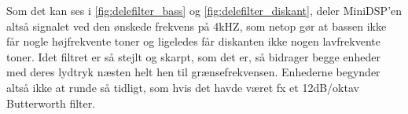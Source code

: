 Som det kan ses i \autoref{fig:delefilter_bass} og  \autoref{fig:delefilter_diskant}, deler MiniDSP'en altså signalet ved den ønskede frekvens på 4kHZ, som netop gør at bassen ikke får nogle højfrekvente toner og ligeledes får diskanten ikke nogen lavfrekvente toner. Idet filtret er så stejlt og skarpt, som det er, så bidrager begge enheder med deres lydtryk næsten helt hen til grænsefrekvensen. Enhederne begynder altså ikke at runde så tidligt, som hvis det havde været fx et 12dB/oktav Butterworth filter.
 

